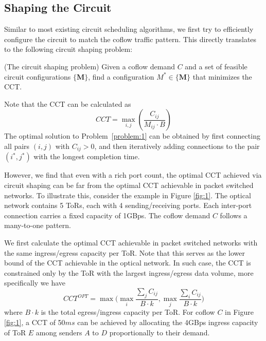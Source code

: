 \subsection{Shaping the Circuit}
\label{sec:alg1}
Similar to most existing circuit scheduling algorithms, we first try to efficiently configure the circuit to match the coflow traffic pattern.
This directly translates to the following circuit shaping problem:
\begin{problem}
\label{problem:1}
(The circuit shaping problem) Given a coflow demand $C$ and a set of feasible circuit configurations $\{\mathbf{M}\}$, find a configuration $M^* \in \{\mathbf{M}\}$ that minimizes the CCT.
\end{problem}
Note that the CCT can be calculated as
\begin{equation}
CCT = \max\limits_{i,j}(\frac{C_{ij}}{M_{ij}\cdot B})
 \label{equ:1}
\end{equation}
The optimal solution to Problem~\ref{problem:1} can be obtained by first connecting all pairs $(i,j)$ with $C_{ij}>0$, and then iteratively adding connections to the pair $(i^*,j^*)$ with the longest completion time.

However, we find that even with a rich port count, the optimal CCT achieved via circuit shaping can be far from the optimal CCT achievable in packet switched networks.
To illustrate this, consider the example in Figure \ref{fig:1}.
The optical network contains 5 ToRs, each with 4 sending/receiving ports. Each inter-port connection carries a fixed capacity of 1GBps.%
The coflow demand $C$ follows a many-to-one pattern.

We first calculate the optimal CCT achievable in packet switched networks with the same ingress/egress capacity per ToR. Note that this serves as the lower bound of the CCT achievable in the optical network. In such case, the CCT is constrained only by the ToR with the largest ingress/egress data volume, more specifically we have
\begin{equation}
CCT^{OPT} = \max\bigg(\max\limits_{i}\frac{\sum_jC_{ij}}{B\cdot k}, \max\limits_{j}\frac{\sum_iC_{ij}}{B\cdot k}\bigg)
 \label{equ:2}
\end{equation}
where $B\cdot k$ is the total egress/ingress capacity per ToR. For coflow $C$ in Figure \ref{fig:1}, a CCT of 50$ms$ can be achieved by allocating the 4GBps ingress capacity of ToR $E$ among senders $A$ to $D$ proportionally to their demand.

